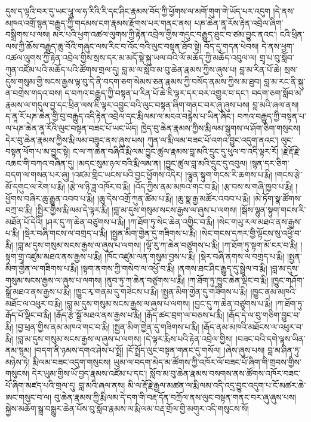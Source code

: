 \documentclass{article}
\begin{document}
དུས་ད་ལྟའི་བར་དུ་ཡང་ཕཱུ་ལ་ཧ་རིའི་རི་དང་ཤིང་རྣམས་བོད་ཀྱི་ཕྱོགས་ལ་མགོ་གུག་གེ་ཡོད་པར་འདུག །དེ་ནས་མཁའ་འགྲོ་སྙན་བརྒྱུད་ཀྱི་གདམས་ངག་རྣམས་རྫོགས་པར་གནང་ནས། པཎ་ཆེན་ནཱ་རོས་རྟེན་འབྲེལ་ཞིག་བསྒྲིགས་པ་ལས། མར་པའི་ཕྱག་འཚལ་ལུགས་ཀྱི་རྟེན་འབྲེལ་གྱིས་གདུང་བརྒྱུད་ཐུང་བ་ཙམ་བྱུང་ནའང་། ངའི་ཕྲིན་ལས་ཀྱི་ཆོས་བརྒྱུད་ཆུ་བོའི་གཞུང་ལས་རིང་བ་འོང་བའི་ལུང་བསྟན་ཐོབ་སྟེ། བོད་དུ་གདན་ཕེབས། དེ་ནས་ཕྱག་འཚལ་ལུགས་ཀྱི་རྟེན་འབྲེལ་གྱིས་སྲས་དར་མ་མདོ་སྡེ་སྐུ་ཡལ་བའི་ལོ་མཆོད་ཀྱི་མཆོད་འབུལ་ལ། གྲྭ་པ་བུ་སློབ་ཀུན་འཛོམ་པའི་མཆོད་པའི་ཚོགས་གྲལ་དུ། བླ་མ་ལ་སློབ་མ་བུ་ཆེན་རྣམས་ཀྱིས་ཞུས་པ། བླ་མ་རིན་པོ་ཆེ། སྲས་དུས་གསུམ་གྱི་སངས་རྒྱས་ལྟ་བུ་དེ་ནི་བདག་ཅག་སེམས་ཅན་རྣམས་ཀྱི་བསོད་ནམས་ཀྱིས་མ་ཐུབ། བླ་མ་རང་ནི་སྐུ་ན་བགྲེས་གདའ་བས། ད་བཀའ་བརྒྱུད་ཀྱི་བསྟན་པ་རིན་པོ་ཆེ་ཇི་ལྟར་དར་བར་འགྱུར་བ་དང་། བདག་ཅག་སློབ་མ་རྣམས་ལ་གདུལ་བྱ་དང་ཕྲིན་ལས་ཇི་ལྟར་འབྱུང་བའི་ལུང་བསྟན་ཞིག་གནང་བར་ཞུ་ཞུས་པས། བླ་མའི་ཞལ་ནས། ད་ནཱ་རོ་པཎ་ཆེན་གྱི་བུ་བརྒྱུད་འདི་རྟེན་འབྲེལ་དང་རྨི་ལམ་ལ་མངའ་བརྙེས་པ་ཡིན་ཞིང་། བཀའ་བརྒྱུད་ཀྱི་བསྟན་པ་ལ་པཎ་ཆེན་ནཱ་རོའི་ལུང་བསྟན་བཟང་པོ་ཡང་ཡོད། ཁྱེད་བུ་ཆེན་རྣམས་ཀྱིས་རྨི་ལམ་སྒུགས་ལ་ཤོག་ཅིག་གསུངས། དེར་བུ་ཆེན་རྣམས་ཀྱིས་རྨི་ལམ་བཟུང་ནས་ཞུས་པས། ཀུན་ལ་རྨི་ལམ་བཟང་པོ་འགའ་བྱུང་འདུག་ནའང་། ལུང་བསྟན་ཕོག་པ་མ་བྱུང་སྟེ། ང་ལ་ཀ་ཆེན་བཞིའི་རྨི་ལམ་བྱུང་ཚུལ་རྣམས་བླ་མའི་དྲུང་དུ་ཕུལ་བ་འདི་ལྟར་རོ། །རྗེ་རྡོ་རྗེ་འཆང་གི་བཀའ་བཞིན་དུ། །མདང་སུམ་ཉལ་བའི་རྨི་ལམ་ན། །བྱུང་ཚུལ་བླ་མའི་དྲུང་དུ་འབུལ། །སྙན་དར་ཅིག་བདག་ལ་གསན་པར་ཞུ། །འཛམ་གླིང་ཡངས་པའི་བྱང་ཕྱོགས་འདིར། །ལྷུན་སྟུག་གངས་རི་ཆགས་པ་རྨི། །གངས་རྩེ་མོ་དགུང་ལ་རེག་པ་རྨི། །རྩེ་ལ་ཉི་ཟླ་འཁོར་བ་རྨི། །འོད་ཀྱིས་ནམ་མཁའ་གང་བ་རྨི། །རྩ་བས་ས་གཞི་ཁྱབ་པ་རྨི། །ཕྱོགས་བཞིར་ཆུ་རྒྱུན་འབབ་པ་རྨི། །ཆུ་དེས་འགྲོ་ཀུན་ཚིམ་པ་རྨི། །ཆུ་སྣ་རྒྱ་མཚོར་འབབ་པ་རྨི། །མེ་ཏོག་སྣ་ཚོགས་བཀྲ་བ་རྨི། །སྤྱིར་གྱིས་རྨི་ལམ་དེ་ལྟར་རྨི། །བླ་མ་དུས་གསུམ་སངས་རྒྱས་ལ་ཞུས་པ་ལགས། །སྒོས་ལྷུན་སྟུག་གངས་རི་མཐོན་པོ་དེའི། །ཤར་དུ་ཀ་ཆེན་བཙུགས་པ་རྨི། །ཀ་ཐོག་ཏུ་སེང་ཆེན་འགྱིང་བ་རྨི། །སེང་གཡུ་རལ་མཐའ་ནས་རྒྱས་པ་རྨི། །སྡེར་བཞི་གངས་ལ་བགྲད་པ་རྨི། །སྤྱན་མིག་གྱེན་དུ་གཟིགས་པ་རྨི། །སེང་གངས་དཀར་གྱི་ལྟོངས་སུ་འཕྱོ་བ་རྨི། །བླ་མ་དུས་གསུམ་སངས་རྒྱས་ལ་ཞུས་པ་ལགས། །ལྷོ་རུ་ཀ་ཆེན་བཙུགས་པ་རྨི། །ཀ་ཐོག་ཏུ་སྟག་མོ་ངར་བ་རྨི། །སྟག་གྲྭ་འཛུམ་མཐའ་ནས་རྒྱས་པ་རྨི། །ཁོང་འཛུམ་ལན་གསུམ་བྱས་པ་རྨི། །སྡེར་བཞི་ནགས་ལ་བགྲད་པ་རྨི། །སྤྱན་མིག་གྱེན་ལ་གཟིགས་པ་རྨི། །སྟག་ནགས་ཀྱི་གསེབ་ལ་འཕྱོ་བ་རྨི། །ནགས་ཐང་ཤིང་རྒྱུད་དུ་སྦྲེལ་བ་རྨི། །བླ་མ་དུས་གསུམ་སངས་རྒྱས་ལ་ཞུས་པ་ལགས། །ནུབ་ཏུ་ཀ་ཆེན་བཙུགས་པ་རྨི། །ཀ་ཐོག་ཏུ་ཁྱུང་ཆེན་ལྡིང་བ་རྨི། །ཁྱུང་གཤོག་སྒྲོ་མཐའ་ནས་རྒྱས་པ་རྨི། །ཁྱུང་རྭ་གནམ་དུ་གཟེངས་པ་རྨི། །སྤྱན་མིག་གྱེན་དུ་གཟིགས་པ་རྨི། །ཁྱུང་ནམ་མཁའི་མཐོང་ལ་འཕུར་བ་རྨི། །བླ་མ་དུས་གསུམ་སངས་རྒྱས་ལ་ཞུས་པ་ལགས། །བྱང་དུ་ཀ་ཆེན་བཙུགས་པ་རྨི། །ཀ་ཐོག་ཏུ་རྒོད་པོ་ལྡིང་བ་རྨི། །རྒོད་རྩེ་སྒྲོ་མཐའ་ནས་རྒྱས་པ་རྨི། །རྒོད་ཚང་བྲག་ལ་བཅས་པ་རྨི། །རྒོད་དེ་ལ་བུ་གཅིག་བྱུང་བ་རྨི། །བྱ་ཕྲན་གྱིས་ནམ་མཁའ་གང་བ་རྨི། །སྤྱན་མིག་གྱེན་དུ་གཟིགས་པ་རྨི། །རྒོད་ནམ་མཁའི་མཐོངས་ལ་འཕུར་བ་རྨི། །བླ་མ་དུས་གསུམ་སངས་རྒྱས་ལ་ཞུས་པ་ལགས། །དེ་ལྟར་རྨིས་པའི་རྟེན་འབྲེལ་གྱིས། །བཟང་བའི་དགེ་ལྟས་ཡིན་ནམ་སྙམ། །བདག་ནི་ཉམས་དགའ་ཤེས་པ་སྤྲོ། །ངོ་སྤྲོད་ལུང་བསྟན་གནང་དུ་གསོལ། །ཞེས་ཞུས་པས། བླ་མ་ཤིན་ཏུ་མཉེས་ཏེ། རྨི་ལམ་བཟང་འདུག་གསུངས། ཡུམ་ལ་བདག་མེད་མ་ཚོགས་ཀྱི་འཁོར་ལོ་བཟང་པོ་ཞིག་གི་གྲབས་གྱིས་གསུངས། དེར་ཡུམ་གྱིས་ཡོ་བྱད་རྣམས་འཛོམ་པ་དང་། སློབ་མ་བུ་ཆེན་རྣམས་བསགས་ནས་ཚོགས་འཁོར་བཟང་པོ་ཞིག་མཛད་པའི་གྲལ་དུ། བླ་མའི་ཞལ་ནས། མི་ལ་རྡོ་རྗེ་རྒྱལ་མཚན་ལ་རྨི་ལམ་འདི་འདྲ་བྱུང་འདུག་པ་ངོ་མཚར་ཆེ་ཨང་གསུང་བ་ལ། བུ་ཆེན་རྣམས་ཀྱི་རྨི་ལམ་དེ་དག་གི་བརྡ་དོན་བཀྲོལ་ནས་ལུང་བསྟན་གནང་བར་ཞུ་ཞུས་པས། སྐྱེས་མཆོག་སྒྲ་བསྒྱུར་ཆེན་པོས་བུ་སློབ་རྣམས་ལ་རྨི་ལམ་བརྡ་གྲོལ་གྱི་མགུར་འདི་གསུངས་སོ། 
\end{document}
